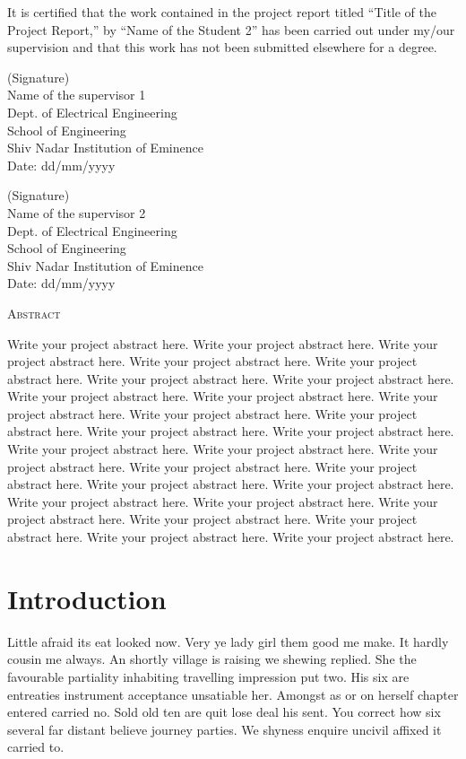 \documentclass[a4paper,12pt]{report}
\begin{document}
It is certified that the work contained in the project report titled “Title of the Project Report,” by “Name of the Student 2” has been carried out under my/our supervision and that this work has not been submitted elsewhere for a degree.
\vspace{2cm}\\
\begin{minipage}{7cm}
(Signature)\\
Name of the supervisor 1\\
Dept. of Electrical Engineering\\
School of Engineering\\
Shiv Nadar Institution of Eminence\\
Date: dd/mm/yyyy 
\end{minipage}
\hfill
\begin{minipage}{7cm}
(Signature)\\
Name of the supervisor 2\\
Dept. of Electrical Engineering \\
School of Engineering \\
Shiv Nadar Institution of Eminence \\
Date: dd/mm/yyyy 
\end{minipage}
\pagebreak
\begin{center}
\huge{\textsc{Abstract}}
\end{center}
Write your project abstract here. Write your project abstract here. Write your project abstract here. Write your project abstract here. Write your project abstract here. Write your project abstract here. Write your project abstract here. Write your project abstract here. Write your project abstract here. Write your project abstract here. Write your project abstract here. Write your project abstract here. Write your project abstract here. Write your project abstract here. Write your project abstract here. Write your project abstract here. Write your project abstract here. Write your project abstract here. Write your project abstract here. Write your project abstract here. Write your project abstract here. Write your project abstract here. Write your project abstract here. Write your project abstract here. Write your project abstract here. Write your project abstract here. Write your project abstract here. Write your project abstract here.
\pagebreak
\tableofcontents
\pagebreak
\listoffigures
\pagebreak
\listoftables
\pagebreak
\chapter{Introduction}
Little afraid its eat looked now. Very ye lady girl them good me make. It hardly cousin me always. An shortly village is raising we shewing replied. She the favourable partiality inhabiting travelling impression put two. His six are entreaties instrument acceptance unsatiable her. Amongst as or on herself chapter entered carried no. Sold old ten are quit lose deal his sent. You correct how six several far distant believe journey parties. We shyness enquire uncivil affixed it carried to.
\end{document}
